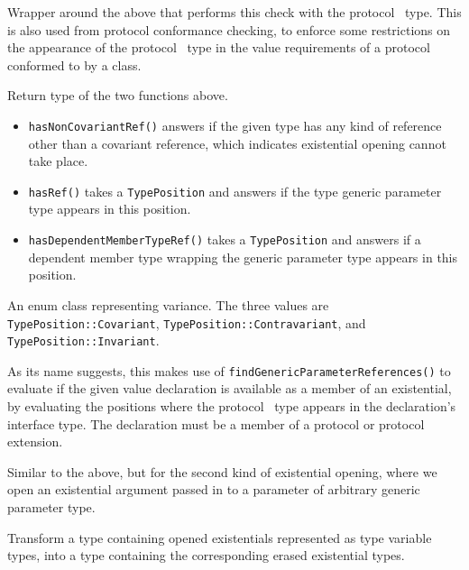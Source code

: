\documentclass[../generics]{subfiles}
\begin{document}
Wrapper around the above that performs this check with the protocol \tSelf\ type. This is also used from protocol conformance checking, to enforce some restrictions on the appearance of the protocol \tSelf\ type in the value requirements of a protocol conformed to by a class.

Return type of the two functions above.
\begin{itemize}
\item \texttt{hasNonCovariantRef()} answers if the given type has any kind of reference other than a covariant reference, which indicates existential opening cannot take place.
\item \texttt{hasRef()} takes a \texttt{TypePosition} and answers if the type generic parameter type appears in this position.
\item \texttt{hasDependentMemberTypeRef()} takes a \texttt{TypePosition} and answers if a dependent member type wrapping the generic parameter type appears in this position.
\end{itemize}

An enum class representing variance. The three values are
\texttt{TypePosition::Covariant}, \texttt{TypePosition::Contravariant}, and \texttt{TypePosition::Invariant}.

As its name suggests, this makes use of \texttt{findGenericParameterReferences()} to evaluate if the given value declaration is available as a member of an existential, by evaluating the positions where the protocol \tSelf\ type appears in the declaration's interface type. The declaration must be a member of a protocol or protocol extension.

Similar to the above, but for the second kind of existential opening, where we open an existential argument passed in to a parameter of arbitrary generic parameter type.

Transform a type containing opened existentials represented as type variable types, into a type containing the corresponding erased existential types.
\end{document}
